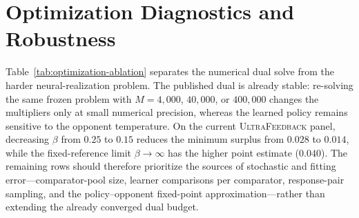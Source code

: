 \documentclass{article}
\theoremstyle{remark}
\theoremstyle{plain}
\begin{document}
\section{Optimization Diagnostics and Robustness}
\label{app:optimization-diagnostics}
Table~\ref{tab:optimization-ablation} separates the numerical dual solve from
the harder neural-realization problem. The published dual is already stable:
re-solving the same frozen problem with $M=4{,}000$, $40{,}000$, or
$400{,}000$ changes the multipliers only at small numerical precision, whereas
the learned policy remains sensitive to the opponent temperature. On the
current \textsc{UltraFeedback} panel, decreasing $\beta$ from $0.25$ to $0.15$
reduces the minimum surplus from $0.028$ to $0.014$, while the
fixed-reference limit $\beta\to\infty$ has the higher point estimate
($0.040$). The remaining rows should therefore prioritize the sources of
stochastic and fitting error---comparator-pool size, learner comparisons per
comparator, response-pair sampling, and the policy--opponent fixed-point
approximation---rather than extending the already converged dual budget.
\end{document}
